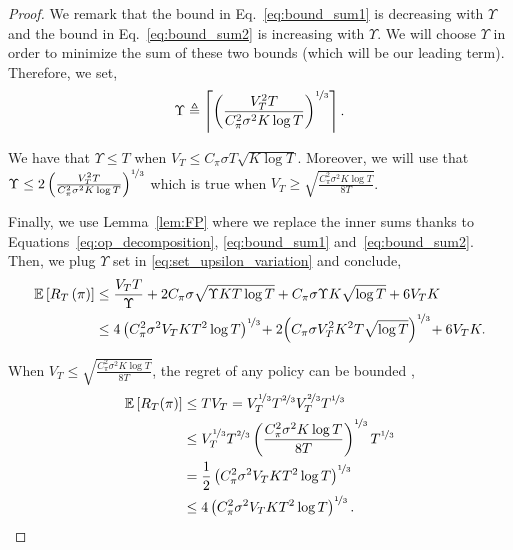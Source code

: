 \begin{proof}
We remark that the bound in Eq.~\ref{eq:bound_sum1} is decreasing with $\Upsilon$ and the bound in Eq.~\ref{eq:bound_sum2} is increasing with $\Upsilon$. We will choose $\Upsilon$ in order to minimize the sum of these two bounds (which will be our leading term). Therefore, we set,
\begin{equation}
    \label{eq:set_upsilon_variation}
    \Upsilon \triangleq \left\lceil\left(\frac{V_T^2 T}{C_\pi^2 \sigma^2 K\log{T}}\right)^{\nicefrac{1}{3}}\right\rceil.
\end{equation}

We have that $\Upsilon\leq T$ when $V_T \leq  C_\pi \sigma T\sqrt{ K\log{T}}$. Moreover, we will use that $ \Upsilon \leq 2 \left(\frac{V_T^2 T}{C_\pi^2 \sigma^2 K\log{T}}\right)^{\nicefrac{1}{3}} $ which is true when $V_T \geq \sqrt{\frac{C_\pi^2 \sigma^2 K\log{T}}{8T}}$. 

Finally, we use Lemma~\ref{lem:FP} where we replace the inner sums thanks to Equations~\ref{eq:op_decomposition}, \ref{eq:bound_sum1} and~\ref{eq:bound_sum2}. Then, we plug $\Upsilon$ set in \ref{eq:set_upsilon_variation} and conclude,
\begin{align*}
\mathbb{E}\left[R_T\left(\pi\right)\right] & \leq \frac{V_T T}{\Upsilon} +  2C_\pi\sigma \sqrt{\Upsilon K T\log{T}} +  C_\pi \sigma \Upsilon  K\sqrt{\log{T}} + 6 V_T K\\
&\leq  4\left(C_\pi^2 \sigma^2 V_T K T^2\log{T}\right)^{\nicefrac{1}{3}} \!+ 2\Big(C_\pi \sigma V_T^2  K^2  T \sqrt{\log{T}}\Big)^{\nicefrac{1}{3}} \!+ 6 V_T K.
\end{align*}

When $V_T\leq  \sqrt{\frac{C_\pi^2 \sigma^2 K \log{T}}{8T}}$, the regret of any policy can be bounded , 
\begin{align*}
\mathbb{E}\left[R_T(\pi)\right] &\leq T V_T = V_T^{\nicefrac{1}{3}} T^{\nicefrac{2}{3}} V_T^{\nicefrac{2}{3}} T^{\nicefrac{1}{3}}\\
&\leq V_T^{\nicefrac{1}{3}} T^{\nicefrac{2}{3}} \left(\frac{ C_\pi^2 \sigma^2 K \log{T}}{8T}\right)^{\nicefrac{1}{3}} T^{\nicefrac{1}{3}}\\ 
&= \frac{1}{2} \left(C_\pi^2\sigma^2 V_T K T^2 \log{T}\right)^{\nicefrac{1}{3}}\\
&\leq 4 \left(C_\pi^2 \sigma^2 V_T K T^2 \log{T}\right)^{\nicefrac{1}{3}}.
\end{align*}


\end{proof}
